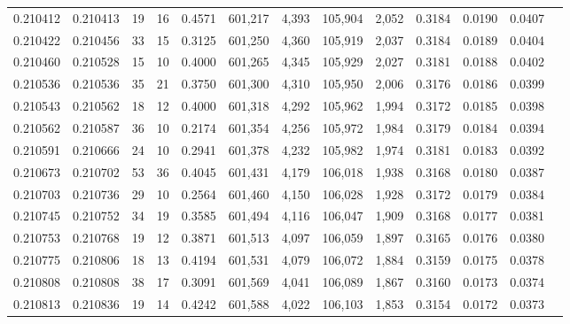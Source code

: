 \begin{tabular}{rrrrrrrrrrrrr}
0.210412 & 0.210413 &    19 &  16 &                                     0.4571 & 601,217 &   4,393 & 105,904 &   2,052 & 0.3184 & 0.0190 & 0.0407 \\
0.210422 & 0.210456 &    33 &  15 &                                     0.3125 & 601,250 &   4,360 & 105,919 &   2,037 & 0.3184 & 0.0189 & 0.0404 \\
0.210460 & 0.210528 &    15 &  10 &                                     0.4000 & 601,265 &   4,345 & 105,929 &   2,027 & 0.3181 & 0.0188 & 0.0402 \\
0.210536 & 0.210536 &    35 &  21 &                                     0.3750 & 601,300 &   4,310 & 105,950 &   2,006 & 0.3176 & 0.0186 & 0.0399 \\
0.210543 & 0.210562 &    18 &  12 &                                     0.4000 & 601,318 &   4,292 & 105,962 &   1,994 & 0.3172 & 0.0185 & 0.0398 \\
0.210562 & 0.210587 &    36 &  10 &                                     0.2174 & 601,354 &   4,256 & 105,972 &   1,984 & 0.3179 & 0.0184 & 0.0394 \\
0.210591 & 0.210666 &    24 &  10 &                                     0.2941 & 601,378 &   4,232 & 105,982 &   1,974 & 0.3181 & 0.0183 & 0.0392 \\
0.210673 & 0.210702 &    53 &  36 &                                     0.4045 & 601,431 &   4,179 & 106,018 &   1,938 & 0.3168 & 0.0180 & 0.0387 \\
0.210703 & 0.210736 &    29 &  10 &                                     0.2564 & 601,460 &   4,150 & 106,028 &   1,928 & 0.3172 & 0.0179 & 0.0384 \\
0.210745 & 0.210752 &    34 &  19 &                                     0.3585 & 601,494 &   4,116 & 106,047 &   1,909 & 0.3168 & 0.0177 & 0.0381 \\
0.210753 & 0.210768 &    19 &  12 &                                     0.3871 & 601,513 &   4,097 & 106,059 &   1,897 & 0.3165 & 0.0176 & 0.0380 \\
0.210775 & 0.210806 &    18 &  13 &                                     0.4194 & 601,531 &   4,079 & 106,072 &   1,884 & 0.3159 & 0.0175 & 0.0378 \\
0.210808 & 0.210808 &    38 &  17 &                                     0.3091 & 601,569 &   4,041 & 106,089 &   1,867 & 0.3160 & 0.0173 & 0.0374 \\
0.210813 & 0.210836 &    19 &  14 &                                     0.4242 & 601,588 &   4,022 & 106,103 &   1,853 & 0.3154 & 0.0172 & 0.0373 \\

\end{tabular}
